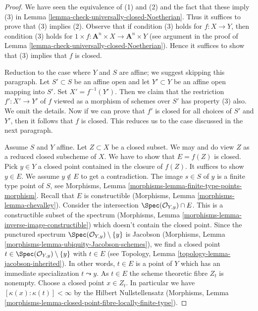 \begin{proof}
We have seen the equivalence of (1) and (2) and the
fact that these imply (3) in
Lemma \ref{lemma-check-universally-closed-Noetherian}.
Thus it suffices to prove that (3) implies (2).
Observe that if condition (3) holds for $f : X \to Y$,
then condition (3) holds for
$1 \times f : \mathbf{A}^n \times X \to \mathbf{A}^n \times Y$
(see argument in the proof of
Lemma \ref{lemma-check-universally-closed-Noetherian}).
Hence it suffices to show that (3) implies that $f$ is closed.

\medskip\noindent
Reduction to the case where $Y$ and $S$ are affine; we suggest
skipping this paragraph.
Let $S' \subset S$ be an affine open and let $Y' \subset Y$ be an
affine open mapping into $S'$. Set $X' = f^{-1}(Y')$. Then we
claim that the restriction $f' : X' \to Y'$ of $f$ viewed as a morphism
of schemes over $S'$ has property (3) also. We omit the details.
Now if we can prove that $f'$ is closed for all choices of
$S'$ and $Y'$, then it follows that $f$ is closed. This reduces
us to the case discussed in the next paragraph.

\medskip\noindent
Assume $S$ and $Y$ affine. Let $Z \subset X$ be a closed subset.
We may and do view $Z$ as a reduced closed subscheme of $X$.
We have to show that $E = f(Z)$ is closed. Pick $y \in Y$ a closed point
contained in the closure of $f(Z)$. It suffices to show $y \in E$.
We assume $y \not \in E$ to get a contradiction.
The image $s \in S$ of $y$ is a finite type point of $S$, see
Morphisms, Lemma \ref{morphisms-lemma-finite-type-points-morphism}.
Recall that $E$ is constructible
(Morphisms, Lemma \ref{morphisms-lemma-chevalley}).
Consider the intersection $\Spec(\mathcal{O}_{Y, y}) \cap E$.
This is a constructible subset of the spectrum
(Morphisms, Lemma \ref{morphisms-lemma-inverse-image-constructible})
which doesn't contain the closed point.
Since the punctured spectrum
$\Spec(\mathcal{O}_{Y, y}) \setminus \{y\}$ is Jacobson
(Morphisms, Lemma \ref{morphisms-lemma-ubiquity-Jacobson-schemes}), we find a
closed point $t \in \Spec(\mathcal{O}_{Y, y}) \setminus \{y\}$
with $t \in E$ (see Topology, Lemma \ref{topology-lemma-jacobson-inherited}).
In other words, $t \in E$ is a point of $Y$ which
has an immediate specialization $t \leadsto y$.
As $t \in E$ the scheme theoretic fibre $Z_t$ is nonempty.
Choose a closed point $x \in Z_t$. In particular we have
$[\kappa(x) : \kappa(t)] < \infty$ by the Hilbert Nullstellensatz
(Morphisms, Lemma
\ref{morphisms-lemma-closed-point-fibre-locally-finite-type}).


\end{proof}
